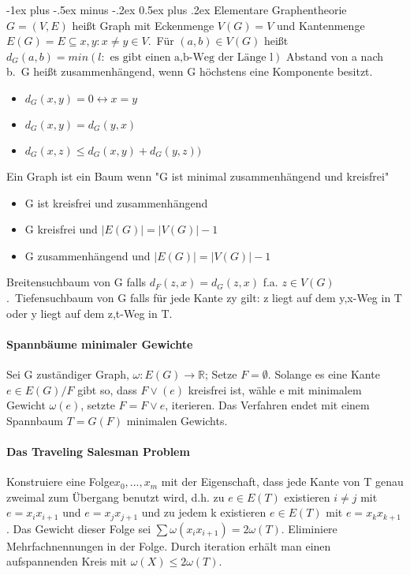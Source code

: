 \documentclass[10pt,landscape]{article}
\makeatletter
\renewcommand{\section}{\@startsection{section}{1}{0mm}%
                                {-1ex plus -.5ex minus -.2ex}%
                                {0.5ex plus .2ex}%
                                {\normalfont\large\bfseries}}
\makeatother
\begin{document}
\begin{multicols}{3}
\section{Elementare Graphentheorie}
$G=(V,E)$ heißt Graph mit Eckenmenge $V(G)=V$ und Kantenmenge $E(G)=E\subseteq {{x,y}:x\not=y \in V}$.\
Für $(a,b)\in V(G)$ heißt $d_G(a,b)=min(l: \text{ es gibt einen a,b-Weg der Länge l} )$ Abstand von a nach b.\
G heißt zusammenhängend, wenn G höchstens eine Komponente besitzt. 
\begin{itemize}
    \item $d_G(x,y)=0 \leftrightarrow x=y$ 
    \item $d_G(x,y)=d_G(y,x)$ 
    \item $d_G(x,z)\leq d_G(x,y) + d_G(y,z))$ 
\end{itemize}

Ein Graph ist ein Baum wenn "G ist minimal zusammenhängend und kreisfrei"
\begin{itemize}
    \item G ist kreisfrei und zusammenhängend
    \item G kreisfrei und $|E(G)|=|V(G)|-1$
    \item G zusammenhängend und $|E(G)|=|V(G)|-1$
\end{itemize}
Breitensuchbaum von G falls $d_F(z,x)=d_G(z,x)$ f.a. $z\in V(G)$.\
Tiefensuchbaum von G falls für jede Kante zy gilt: z liegt auf dem y,x-Weg in T oder y liegt auf dem z,t-Weg in T.

\paragraph{Spannbäume minimaler Gewichte}
Sei G zuständiger Graph, $\omega:E(G)\rightarrow \mathbb{R}$; Setze $F=\emptyset$. Solange es eine Kante $e\in E(G)/F$ gibt so, dass $F \vee (e)$ kreisfrei ist, wähle e mit minimalem Gewicht $\omega(e)$, setzte $F=F\vee {e}$, iterieren. Das Verfahren endet mit einem Spannbaum $T=G(F)$ minimalen Gewichts.

\paragraph{Das Traveling Salesman Problem}
Konstruiere eine Folge$x_0,...,x_m$ mit der Eigenschaft, dass jede Kante von T genau zweimal zum Übergang benutzt wird, d.h. zu $e\in E(T)$ existieren $i\not = j$ mit $e=x_i x_{i+1}$ und $e=x_j x_{j+1}$ und zu jedem k existieren $e\in E(T)$ mit $e=x_k x_{k+1}$. Das Gewicht dieser Folge sei $\sum \omega(x_i x_{i+1})= 2\omega(T)$. Eliminiere Mehrfachnennungen in der Folge. Durch iteration erhält man einen aufspannenden Kreis mit $\omega(X) \leq 2 \omega(T)$.


\end{multicols}
\end{document}
